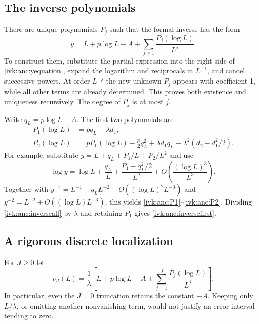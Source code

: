 \documentclass[11pt,letterpaper]{article}
\theoremstyle{remark}\newtheorem{remark}[theorem]{Remark}
\begin{document}
\subsection{The inverse polynomials}
There are unique polynomials $P_j$ such that the formal inverse
has the form
\begin{equation}\label{ivk:anc:inverseall}
 y=L+p\log L-A+
            \sum_{j\ge1}\frac{P_j(\log L)}{L^j}.
\end{equation}
To construct them, substitute the partial expression into the
right side of \eqref{ivk:anc:yequation}, expand the logarithm and
reciprocals in $L^{-1}$, and cancel successive powers. At order
$L^{-j}$ the new unknown $P_j$ appears with coefficient 1, while
all other terms are already determined. This proves both existence
and uniqueness recursively. The degree of $P_j$ is at most $j$.

Write $q_L=p\log L-A$. The first two polynomials are
\begin{align}
 P_1(\log L)&=pq_L-\lambda d_1,\label{ivk:anc:P1}\\
 P_2(\log L)&=pP_1(\log L)-\frac p2q_L^2
           +\lambda d_1q_L-\lambda^2(d_2-d_1^2/2).
                                                        \label{ivk:anc:P2}
\end{align}
For example, substitute $y=L+q_L+P_1/L+P_2/L^2$ and use
\[
 \log y=\log L+\frac{q_L}{L}
                   +\frac{P_1-q_L^2/2}{L^2}
                   +O\!\left(\frac{(\log L)^3}{L^3}\right).
\]
Together with $y^{-1}=L^{-1}-q_LL^{-2}+O((\log L)^2L^{-3})$
and $y^{-2}=L^{-2}+O((\log L)L^{-3})$, this yields
\eqref{ivk:anc:P1}--\eqref{ivk:anc:P2}. Dividing \eqref{ivk:anc:inverseall} by $\lambda$
and retaining $P_1$ gives \eqref{ivk:anc:inversefirst}.

\subsection{A rigorous discrete localization}
For $J\ge0$ let
\begin{equation}\label{ivk:anc:nuJ}
 \nu_J(L)=\frac1\lambda\left[
 L+p\log L-A+\sum_{j=1}^J\frac{P_j(\log L)}{L^j}\right].
\end{equation}
In particular, even the $J=0$ truncation retains the constant
$-A$. Keeping only $L/\lambda$, or omitting another nonvanishing
term, would not justify an error interval tending to zero.
\end{document}
